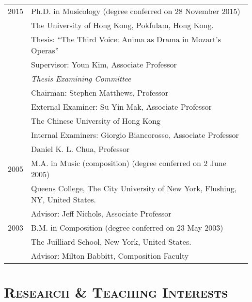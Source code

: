 \documentclass[letter,11pt]{article}
\begin{document}
  \hspace*{-0.25cm}
  \begin{tabular}{p{2.5cm} l}
    2015 & Ph.D. in Musicology (degree conferred on 28 November 2015)\\
    & The University of Hong Kong, Pokfulam, Hong Kong.\\
    & Thesis: ``The Third Voice: Anima as Drama in Mozart's Operas''\\
    & Supervisor: Youn Kim, Associate Professor\\[2mm]
    & \textit{Thesis Examining Committee}\\
    & Chairman: Stephen Matthews, Professor\\
    & External Examiner: Su Yin Mak, Associate Professor\\
    & \hspace*{28.5mm} The Chinese University of Hong Kong\\
    & Internal Examiners: Giorgio Biancorosso, Associate Professor\\
    & \hspace*{29.5mm} Daniel K. L. Chua, Professor\\[2mm]
    
%		
	2005 & M.A. in Music (composition) (degree conferred on 2 June 2005)\\
	& Queens College, The City University of New York, Flushing, NY, United States.\\
	& Advisor: Jeff Nichols, Associate Professor\\[2mm]

    2003 & B.M. in Composition (degree conferred on 23 May 2003)\\
    & The Juilliard School, New York, United States.\\
    & Advisor: Milton Babbitt, Composition Faculty
  \end{tabular}
  
  \vspace{5mm}
  
  \section*{\textsc{Research \& Teaching Interests}}
  
\end{document}
